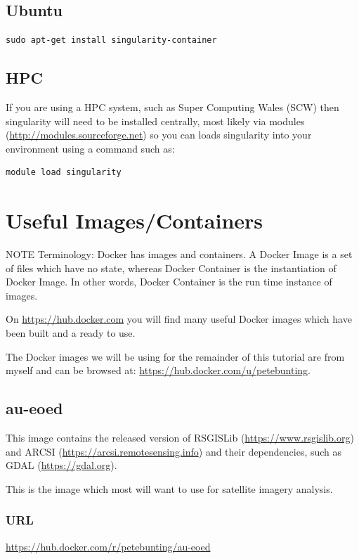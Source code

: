 \documentclass[authoryear, 11pt, oneside]{report}
\begin{document}
\subsection{Ubuntu}
\begin{verbatim}
sudo apt-get install singularity-container
\end{verbatim}

\subsection{HPC}
If you are using a HPC system, such as Super Computing Wales (SCW) then singularity will need to be installed centrally, most likely via modules (\url{http://modules.sourceforge.net}) so you can loads singularity into your environment using a command such as:

\begin{verbatim}
module load singularity
\end{verbatim}

\section{Useful Images/Containers}

NOTE Terminology: Docker has images and containers. A Docker Image is a set of files which have no state, whereas Docker Container is the instantiation of Docker Image. In other words, Docker Container is the run time instance of images.

On \url{https://hub.docker.com} you will find many useful Docker images which have been built and a ready to use.

The Docker images we will be using for the remainder of this tutorial are from myself and can be browsed at: \url{https://hub.docker.com/u/petebunting}.

\subsection{au-eoed}

This image contains the released version of RSGISLib (\url{https://www.rsgislib.org}) and ARCSI (\url{https://arcsi.remotesensing.info}) and their dependencies, such as GDAL (\url{https://gdal.org}). 

This is the image which most will want to use for satellite imagery analysis.

\subsubsection{URL}
\url{https://hub.docker.com/r/petebunting/au-eoed}
\end{document}
